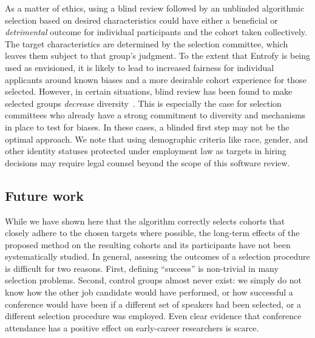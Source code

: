 \documentclass[10pt,letterpaper]{article}
\begin{document}
As a matter of ethics, using a blind review followed by an unblinded algorithmic selection based on desired characteristics could have either a beneficial or \emph{detrimental} outcome for individual participants and the cohort taken collectively.
The target characteristics are determined by the selection committee, which leaves them subject to that group's judgment.
To the extent that Entrofy is being used as envisioned, it is likely to lead to increased fairness for individual applicants around known biases and a more desirable cohort experience for those selected.
However, in certain situations, blind review has been found to make selected groups \textit{decrease} diversity~\cite{behaghel2015unintended}.
This is especially the case for selection committees who already have a strong commitment to diversity and mechanisms in place to test for biases.
In these cases, a blinded first step may not be the optimal approach.
We note that using demographic criteria like race, gender, and other identity statuses protected under employment law as targets in hiring decisions may require legal counsel beyond the scope of this software review.

\subsection*{Future work}
While we have shown here that the algorithm correctly selects cohorts that closely adhere to the chosen targets where possible, the long-term effects of the proposed method on the resulting cohorts and its participants have not been systematically studied.
In general, assessing the outcomes of a selection procedure is difficult for two reasons.
First, defining ``success'' is non-trivial in many selection problems.
Second, control groups almost never exist: we simply do not know how the other job candidate would have performed, or how successful a conference would have been if a different set of speakers had been selected, or a different selection procedure was employed.
Even clear evidence that conference attendance has a positive effect on early-career researchers is scarce.
\end{document}
